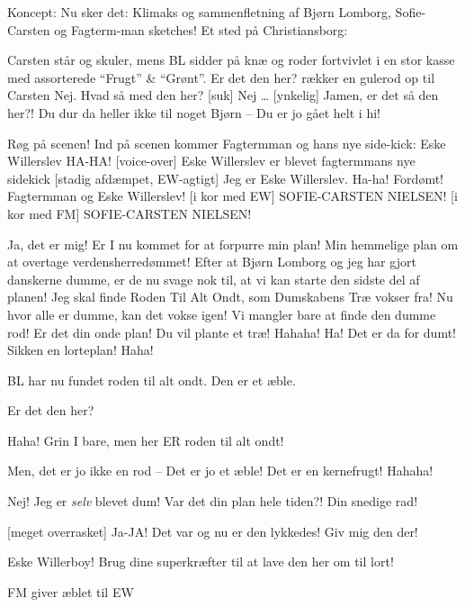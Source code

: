 \documentclass[a4paper,11pt]{article}
\begin{document}
\begin{sketch}

Koncept:
Nu sker det: Klimaks og sammenfletning af Bjørn Lomborg, Sofie-Carsten og Fagterm-man sketches! Et sted på Christiansborg:

\scene Carsten står og skuler, mens BL sidder på knæ og roder fortvivlet i en stor kasse med assorterede ``Frugt'' \& ``Grønt''.
 Er det den her? rækker en gulerod op til Carsten
 Nej.
 Hvad så med den her?
[suk] Nej \ldots
{}[ynkelig] Jamen, er det så den her?!
 Du dur da heller ikke til noget Bjørn -- Du er jo gået helt i hi!

\scene Røg på scenen!
\scene Ind på scenen kommer Fagtermman og hans nye side-kick: Eske Willerslev
 HA-HA!
[voice-over] Eske Willerslev er blevet fagtermmans nye sidekick
[stadig afdæmpet, EW-agtigt] Jeg er Eske Willerslev. Ha-ha! 
 Fordømt! Fagtermman og Eske Willerslev!
[i kor med EW] SOFIE-CARSTEN NIELSEN!
[i kor med FM] SOFIE-CARSTEN NIELSEN!

 Ja, det er mig! Er I nu kommet for at forpurre min plan! Min
hemmelige plan  om at overtage verdensherredømmet! Efter at Bjørn
Lomborg og jeg har gjort danskerne dumme, er de nu svage nok til, at
vi kan starte den sidste del af planen! Jeg skal finde Roden Til Alt
Ondt, som Dumskabens Træ vokser fra! Nu hvor alle er dumme, kan det vokse igen! Vi mangler bare at finde den dumme rod!
Er det din onde plan! Du vil plante et træ! Hahaha!
Ha! Det er da for dumt! Sikken en lorteplan! Haha!

\scene BL har nu fundet roden til alt ondt. Den er et æble. 

 Er det den her?

 Haha! Grin I bare, men her ER roden til alt ondt! 

 Men, det er jo ikke en rod  -- Det er jo et æble! Det er en kernefrugt! Hahaha!

 Nej! Jeg er \emph{selv} blevet dum! Var det din plan hele tiden?! Din snedige rad!

[meget overrasket] Ja-JA! Det var og nu er den lykkedes! Giv mig den der! 

 Eske Willerboy! Brug dine superkræfter til at lave den her om til lort! 

\scene FM giver æblet til EW


\end{sketch}
\end{document}
